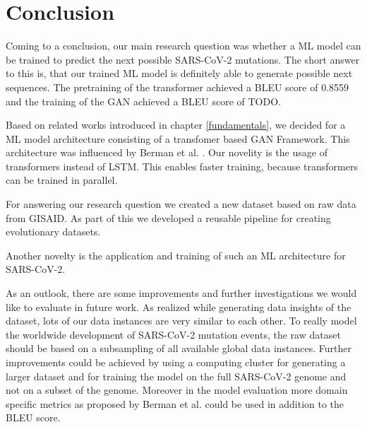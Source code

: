 \section{Conclusion} \label{conclusion}

Coming to a conclusion, our main research question was whether a \ac{ML} model can be trained to predict the next possible \ac{SARS-CoV-2} mutations.
The short answer to this is, that our trained \ac{ML} model is definitely able to generate possible next sequences. The pretraining of the transformer achieved a \ac{BLEU} score of 0.8559 and the training of the \ac{GAN} achieved a \ac{BLEU} score of TODO.

Based on related works introduced in chapter \ref{fundamentals}, we decided for a \ac{ML} model architecture consisting of a transfomer based \ac{GAN} Framework. This architecture was influenced by Berman et al. \cite{Berman2020}. Our novelity is the usage of transformers instead of \ac{LSTM}. This enables faster training, because transformers can be trained in parallel. 

For answering our research question we created a new dataset based on raw data from \ac{GISAID}. As part of this we developed a reusable pipeline for creating evolutionary datasets.

Another novelty is the application and training of such an \ac{ML} architecture for \ac{SARS-CoV-2}.


\vspace{0.5cm}

As an outlook, there are some improvements and further investigations we would like to evaluate in future work. As realized while generating data insights of the dataset, lots of our data instances are very similar to each other. To really model the worldwide development of \ac{SARS-CoV-2} mutation events, the raw dataset should be based on a subsampling of all available global data instances. Further improvements could be achieved by using a computing cluster for generating a larger dataset and for training the model on the full \ac{SARS-CoV-2} genome and not on a subset of the genome. Moreover in the model evaluation more domain specific metrics as proposed by Berman et al. \cite{Berman2020} could be used in addition to the BLEU score.
